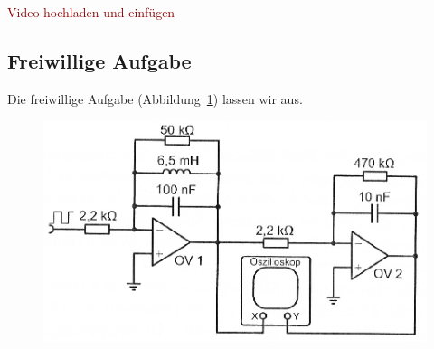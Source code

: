 \textcolor{darkred}{Video hochladen und einfügen}

\FloatBarrier
\subsection{Freiwillige Aufgabe}

Die freiwillige Aufgabe (Abbildung~\ref{fig:5-2}) lassen wir aus.

\begin{figure}[htbp]
	\centering
	\includegraphics[width=.8\linewidth]{Anleitung/5-2.png}
	\caption{%
		\cite[Abbildung~5.2]{physik313-Anleitung}
	}
	\label{fig:5-2}
\end{figure}


\FloatBarrier
\IfFileExists{\bibliographyfile}{
	
}{}



